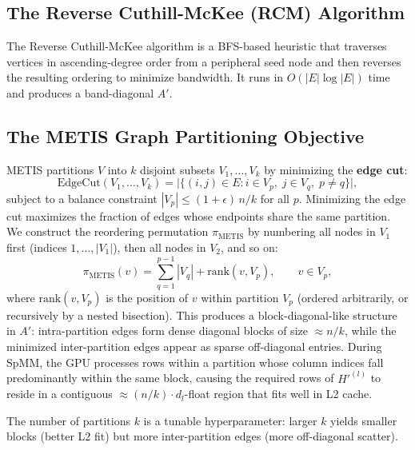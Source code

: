 \documentclass[sigconf,review]{acmart}
\begin{document}
\subsection{The Reverse Cuthill-McKee (RCM) Algorithm}
\label{sec:rcm}

The Reverse Cuthill-McKee algorithm \cite{cuthill1969bandwidth} is a BFS-based heuristic that traverses vertices in ascending-degree order from a peripheral seed node and then reverses the resulting ordering to minimize bandwidth. It runs in $O(|E|\log|E|)$ time and produces a band-diagonal $A'$.

\subsection{The METIS Graph Partitioning Objective}
\label{sec:metis}

METIS \cite{karypis1998metis} partitions $V$ into $k$ disjoint subsets $V_1, \dots, V_k$ by minimizing the \textbf{edge cut}:
\begin{equation}\label{eq:edgecut}
    \text{EdgeCut}(V_1,\dots,V_k) = \bigl|\{(i,j) \in E : i \in V_p,\; j \in V_q,\; p \neq q\}\bigr|,
\end{equation}
subject to a balance constraint $|V_p| \le (1+\epsilon)\, n/k$ for all $p$. Minimizing the edge cut maximizes the fraction of edges whose endpoints share the same partition. We construct the reordering permutation $\pi_{\text{METIS}}$ by numbering all nodes in $V_1$ first (indices $1,\dots,|V_1|$), then all nodes in $V_2$, and so on:
\begin{equation}\label{eq:metis_perm}
    \pi_{\text{METIS}}(v) = \sum_{q=1}^{p-1} |V_q| + \text{rank}(v, V_p), \qquad v \in V_p,
\end{equation}
where $\text{rank}(v,V_p)$ is the position of $v$ within partition $V_p$ (ordered arbitrarily, or recursively by a nested bisection). This produces a block-diagonal-like structure in $A'$: intra-partition edges form dense diagonal blocks of size $\approx n/k$, while the minimized inter-partition edges appear as sparse off-diagonal entries. During SpMM, the GPU processes rows within a partition whose column indices fall predominantly within the same block, causing the required rows of $H'^{(l)}$ to reside in a contiguous $\approx (n/k)\cdot d_l$-float region that fits well in L2 cache.

The number of partitions $k$ is a tunable hyperparameter: larger $k$ yields smaller blocks (better L2 fit) but more inter-partition edges (more off-diagonal scatter).
\end{document}
